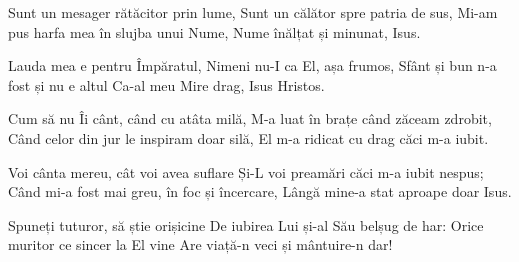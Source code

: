 \beginverse
Sunt un mesager rătăcitor prin lume,
Sunt un călător spre patria de sus,
Mi-am pus harfa mea în slujba unui Nume,
Nume înălțat și minunat, Isus.
\endverse

\beginchorus
Lauda mea e pentru Împăratul,
Nimeni nu-I ca El, așa frumos,
Sfânt și bun n-a fost și nu e altul
Ca-al meu Mire drag, Isus Hristos.
\endchorus

\beginverse
Cum să nu Îi cânt, când cu atâta milă,
M-a luat în brațe când zăceam zdrobit,
Când celor din jur le inspiram doar silă,
El m-a ridicat cu drag căci m-a iubit.
\endverse

\beginverse
Voi cânta mereu, cât voi avea suflare
Și-L voi preamări căci m-a iubit nespus;
Când mi-a fost mai greu, în foc și încercare,
Lângă mine-a stat aproape doar Isus.
\endverse

\beginverse
Spuneți tuturor, să știe orișicine
De iubirea Lui și-al Său belșug de har:
Orice muritor ce sincer la El vine
Are viață-n veci și mântuire-n dar!
\endverse
\endsong